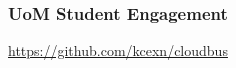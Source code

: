 \begin{frame}
	\frametitle{UoM Student Engagement}
	\begin{center}
		\LARGE \href{https://github.com/kcexn/cloudbus}{https://github.com/kcexn/cloudbus}
	\end{center}
\end{frame}